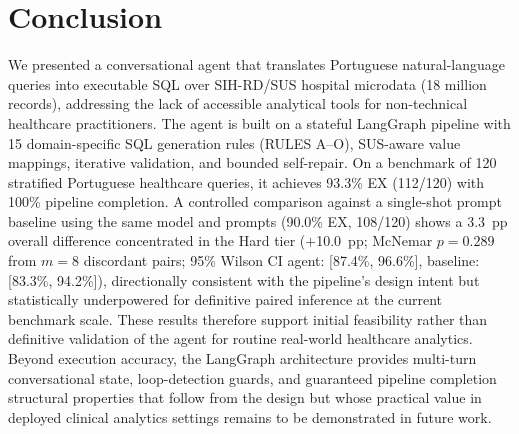 \documentclass[conference]{IEEEtran}
\begin{document}



\section{Conclusion}
\label{sec:conclusions}
We presented a conversational agent that translates Portuguese natural-language queries into executable SQL over SIH-RD/SUS hospital microdata (18 million records), addressing the lack of accessible analytical tools for non-technical healthcare practitioners. The agent is built on a stateful LangGraph pipeline with 15 domain-specific SQL generation rules (RULES A--O), SUS-aware value mappings, iterative validation, and bounded self-repair. On a benchmark of 120 stratified Portuguese healthcare queries, it achieves 93.3\% EX (112/120) with 100\% pipeline completion. A controlled comparison against a single-shot prompt baseline using the same model and prompts (90.0\% EX, 108/120) shows a 3.3~pp overall difference concentrated in the Hard tier ($+$10.0~pp; McNemar $p{=}0.289$ from $m{=}8$ discordant pairs; 95\% Wilson CI agent: [87.4\%, 96.6\%], baseline: [83.3\%, 94.2\%]), directionally consistent with the pipeline's design intent but statistically underpowered for definitive paired inference at the current benchmark scale. These results therefore support initial feasibility rather than definitive validation of the agent for routine real-world healthcare analytics. Beyond execution accuracy, the LangGraph architecture provides multi-turn conversational state, loop-detection guards, and guaranteed pipeline completion structural properties that follow from the design but whose practical value in deployed clinical analytics settings remains to be demonstrated in future work.
\end{document}
